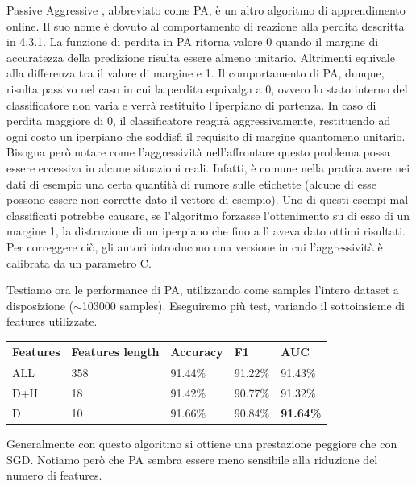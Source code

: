 Passive Aggressive \cite{crammer06}, abbreviato come PA, è un altro algoritmo di apprendimento online. Il suo nome è dovuto al comportamento di reazione alla perdita descritta in 4.3.1.
La funzione di perdita in PA ritorna valore 0 quando il margine di accuratezza della predizione risulta essere almeno unitario. Altrimenti equivale alla differenza tra il valore di margine e 1. Il comportamento di PA, dunque, risulta passivo nel caso in cui la perdita equivalga a 0, ovvero lo stato interno del classificatore non varia e verrà restituito l'iperpiano di partenza. In caso di perdita maggiore di 0, il classificatore reagirà aggressivamente, restituendo ad ogni costo un iperpiano che soddisfi il requisito di margine quantomeno unitario. Bisogna però notare come l’aggressività nell’affrontare questo problema possa essere eccessiva in alcune situazioni reali. Infatti, è comune nella pratica avere nei dati di esempio una certa quantità di rumore sulle etichette (alcune di esse possono essere non corrette dato il vettore di esempio). Uno di questi esempi mal classificati potrebbe causare, se l'algoritmo forzasse l’ottenimento su di esso di un margine 1, la distruzione di un iperpiano che fino a lì aveva dato ottimi risultati. Per correggere ciò, gli autori introducono una versione in cui l’aggressività è calibrata da un parametro C.



Testiamo ora le performance di PA, utilizzando come samples l'intero dataset a disposizione ($\sim$103000 samples). Eseguiremo più test, variando il sottoinsieme di features utilizzate.\newline

\begin{tabular}{ |l|l|l|l|l| }
	\hline
	\textbf{Features} & \textbf{Features length} & \textbf{Accuracy} & \textbf{F1}  & \textbf{AUC} \\ \hline
	ALL & 358 & 91.44\% & 91.22\% & 91.43\% \\ \hline
	D+H & 18 & 91.42\% & 90.77\% & 91.32\% \\ \hline
	D & 10 & 91.66\% & 90.84\% & \textbf{91.64\%} \\
	\hline
\end{tabular}
\newline\newline

Generalmente con questo algoritmo si ottiene una prestazione peggiore che con SGD. Notiamo però che PA sembra essere meno sensibile alla riduzione del numero di features.

